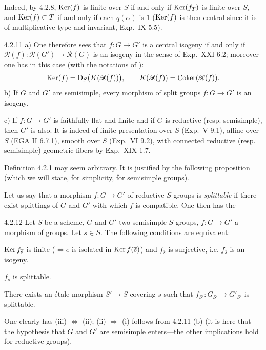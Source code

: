 Indeed, by 4.2.8, $\operatorname{Ker}(f)$ is finite over $S$ if and only if $\operatorname{Ker}(f_T)$ is finite over $S$, and $\operatorname{Ker}(f)\subset T$ if and only if each $q(\alpha)$ is $1$ ($\operatorname{Ker}(f)$ is then central since it is of multiplicative type and invariant, \cf Exp.~IX 5.5).
\begin{remark}{4.2.11}\label{XXII.4.2.11}
a) One therefore sees that $f:G\to G'$ is a central isogeny if and only if $\mathscr R(f):\mathscr R(G')\to\mathscr R(G)$ is an isogeny in the sense of Exp.~XXI 6.2; moreover one has in this case (with the notations of \loccit):
\[
\operatorname{Ker}(f)=\mathrm D_S\bigl(K(\mathscr R(f))\bigr),\qquad K(\mathscr R(f))=\operatorname{Coker}(\mathscr R(f)).
\]
b) If $G$ and $G'$ are semisimple, every morphism of split groups $f:G\to G'$ is an isogeny{\renewcommand{\thefootnote}{(21)}}.

c) If $f:G\to G'$ is faithfully flat and finite and if $G$ is reductive (resp. semisimple), then $G'$ is also. It is indeed of finite presentation over $S$ (Exp.~V 9.1), affine over $S$ (EGA II 6.7.1), smooth over $S$ (Exp.~VI 9.2), with connected reductive (resp. semisimple) geometric fibers by Exp.~XIX 1.7.
\end{remark}
Definition 4.2.1 may seem arbitrary. It is justified by the following proposition (which we will state, for simplicity, for semisimple groups).

Let us say that a morphism $f:G\to G'$ of reductive $S$-groups is \emph{splittable} if there exist splittings of $G$ and $G'$ with which $f$ is compatible. One then has the
\begin{proposition}{4.2.12}\label{XXII.4.2.12}
Let $S$ be a scheme, $G$ and $G'$ two semisimple $S$-groups, $f:G\to G'$ a morphism of groups. Let $s\in S$. The following conditions are equivalent:
\begin{enumeratei}
\item $\operatorname{Ker} f_{\overline s}$ is finite ($\Leftrightarrow e$ is isolated in $\operatorname{Ker} f(\overline s)$) and $f_{\overline s}$ is surjective, i.e. $f_{\overline s}$ is an isogeny.
\item $f_{\overline s}$ is splittable.
\item There exists an \'etale morphism $S'\to S$ covering $s$ such that $f_{S'}:G_{S'}\to G'_{S'}$ is splittable.
\end{enumeratei}
\end{proposition}
One clearly has (iii) $\Leftrightarrow$ (ii); (ii) $\Rightarrow$ (i) follows from 4.2.11 (b) (it is here that the hypothesis that $G$ and $G'$ are semisimple enters---the other implications hold for reductive groups).

